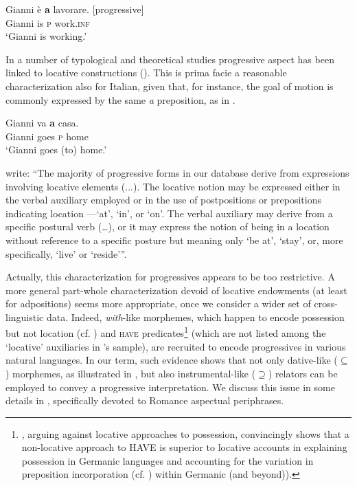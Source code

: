 \documentclass[output=paper,modfonts,nonflat,newtxmath,colorlinks,citecolor=brown]{langsci/langscibook}
\begin{document}
     \ex \label{ex:franco:10b}
    \gll Gianni è \textbf{a} lavorare.   \hfill [progressive]\\
        Gianni is \textsc{p} work.\textsc{inf}\\
    \glt ‘Gianni is working.’
    \z
    \z
  

In a number of typological and theoretical studies progressive aspect has been linked to locative constructions (\citealt{BybeeEtAl1994,MateuAmadas1999,DemirdacheUribe-Etxebarria1997}).  This is {prima facie} a reasonable characterization also for Italian, given that, for instance, the goal of motion is commonly expressed by the same \textit{a} preposition, as in . 

\ea%
    \label{ex:franco:11}
    \gll  Gianni va \textbf{a} casa.\\
         Gianni goes \textsc{p} home\\
    \glt ‘Gianni goes (to) home.’
    \z

\citet[129--130]{BybeeEtAl1994} write: “The majority of progressive forms in our database derive from expressions involving locative elements (...). The locative notion may be expressed either in the verbal auxiliary employed or in the use of postpositions or prepositions indicating location —‘at’, ‘in’, or ‘on’. The verbal auxiliary may derive from a specific postural verb (…), or it may express the notion of being in a location without reference to a specific posture but meaning only ‘be at’, ‘stay’, or, more specifically, ‘live’ or ‘reside’”.

Actually, this characterization for progressives appears to be too restrictive. A more general part-whole characterization devoid of locative endowments (at least for adpositions) seems more appropriate, once we consider a wider set of cross-linguistic data. Indeed, \textit{with}{}-like morphemes, which happen to encode possession but not location (cf. \citealt{Levinson2011}) and \textsc{have} predicates\footnote{\citet{Levinson2011}, arguing against locative approaches to possession, convincingly shows that a non-locative approach to HAVE is superior to locative accounts in explaining possession in Germanic languages and accounting for the variation in preposition incorporation (cf. \citealt{Kayne1993, Harley2002}) within Germanic (and beyond)).} (which are not listed among the ‘locative’ auxiliaries in \citeauthor{BybeePerkinsPagliuca1994}’s sample), are recruited to encode progressives in various natural languages. In our term, such evidence shows that not only dative-like (${\subseteq}$) morphemes, as illustrated in , but also instrumental-like (${\supseteq}$) relators can be employed to convey a progressive interpretation. We discuss this issue in some details in , specifically devoted to Romance aspectual periphrases. 
\end{document}
